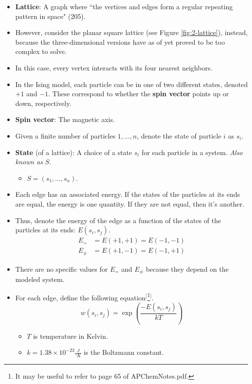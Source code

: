 \documentclass[titlepage]{article}
\numberwithin{figure}{section}
\numberwithin{table}{section}
\numberwithin{equation}{section}
\newcommand{\dq}[2]{``#1" (#2).}
\begin{document}
\begin{itemize}
    \item \textbf{Lattice}: A graph where \dq{the vertices and edges form a regular repeating pattern in space}{205}
    \item However, consider the planar square lattice (see Figure \ref{fig:2-lattice}), instead, because the three-dimensional versions have as of yet proved to be too complex to solve.
    \item In this case, every vertex interacts with its four nearest neighbors.
    \item In the Ising model, each particle can be in one of two different states, denoted $+1$ and $-1$. These correspond to whether the \textbf{spin vector} points up or down, respectively.
    \item \textbf{Spin vector}: The magnetic axis.
    \item Given a finite number of particles $1,\dots,n$, denote the state of particle $i$ as $s_i$.
    \item \textbf{State} (of a lattice): A choice of a state $s_i$ for each particle in a system. \emph{Also known as} $S$.
    \begin{itemize}
        \item $S=\left( s_1,\dots,s_n \right)$.
    \end{itemize}
    \item Each edge has an associated energy. If the states of the particles at its ends are equal, the energy is one quantity. If they are not equal, then it's another.
    \item Thus, denote the energy of the edge as a function of the states of the particles at its ends: $E(s_i,s_j)$.
    \begin{align*}
        E_= &= E(+1,+1) = E(-1,-1)\\
        E_{\neq} &= E(+1,-1) = E(-1,+1)
    \end{align*}
    \item There are no specific values for $E_=$ and $E_{\neq}$ because they depend on the modeled system.
    \item For each edge, define the following equation$^[$\footnote{It may be useful to refer to page 65 of APChemNotes.pdf.}$^]$.
    \begin{equation*}
        w(s_i,s_j) = \exp\left( \frac{-E(s_i,s_j)}{kT} \right)
    \end{equation*}
    \begin{itemize}
        \item $T$ is temperature in Kelvin.
        \item $k=1.38\times 10^{-23} \frac{J}{{}^\circ K}$ is the Boltzmann constant.

\end{itemize}
\end{itemize}
\end{document}

